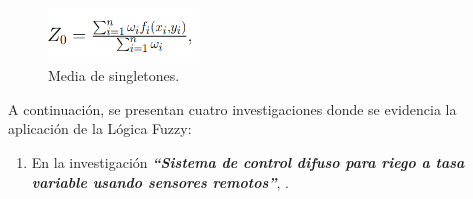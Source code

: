 \documentclass[10pt,conference]{IEEEtran}
\begin{document}
    \begin{figure}[H]
    \begin{center}
    \includegraphics[width=4cm,height=1.5cm]{figuras/ec4.PNG}
    \caption{Media de singletones.}
    \label{C35} 
    \end{center}
    \end{figure}
A continuación, se presentan cuatro investigaciones donde se evidencia la aplicación de la Lógica Fuzzy:
\begin{enumerate}
\item En la investigación \textit{\textbf{“Sistema de control difuso para riego a tasa variable usando sensores remotos”}}, \citep{MENDES201913}.


\end{enumerate}
\end{document}
